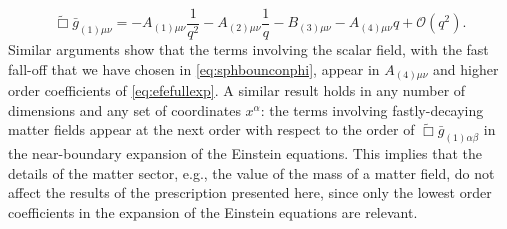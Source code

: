 \documentclass[aps,letterpaper,twocolumn,nofootinbib]{revtex4}
\numberwithin{equation}{section}
\begin{document}
\begin{equation}
\label{eq:waveEFE}
\tilde{\Box}\bar{g}_{(1)\mu\nu}=-A_{(1)\mu\nu}\frac{1}{q^2}-A_{(2)\mu\nu}\frac{1}{q}-B_{(3)\mu\nu}-A_{(4)\mu\nu}q+\mathcal{O}(q^2).
\end{equation}
Similar arguments show that the terms involving the scalar field, with the fast fall-off that we have chosen in \eqref{eq:sphbounconphi}, appear in $A_{(4)\mu\nu}$ and higher order coefficients of \eqref{eq:efefullexp}. A similar result holds in any number of dimensions and any set of coordinates $x^\alpha$: the terms involving fastly-decaying matter fields appear at the next order with respect to the order of $\tilde{\Box}\bar{g}_{(1)\alpha\beta}$ in the near-boundary expansion of the Einstein equations. This implies that the details of the matter sector, e.g., the value of the mass of a matter field, do not affect the results of the prescription presented here, since only the lowest order coefficients in the expansion of the Einstein equations are relevant.
\end{document}
